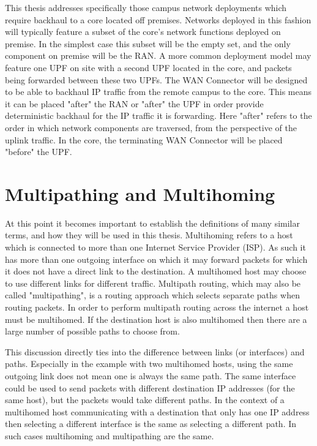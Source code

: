 This thesis addresses specifically those campus network deployments which require backhaul to a core located off premises. Networks deployed in this fashion will typically feature a subset of the core's network functions deployed on premise. In the simplest case this subset will be the empty set, and the only component on premise will be the RAN. A more common deployment model may feature one UPF on site with a second UPF located in the core, and packets being forwarded between these two UPFs. The WAN Connector will be designed to be able to backhaul IP traffic from the remote campus to the core. This means it can be placed "after" the RAN or "after" the UPF in order provide deterministic backhaul for the IP traffic it is forwarding. Here "after" refers to the order in which network components are traversed, from the perspective of the uplink traffic. In the core, the terminating WAN Connector will be placed "before" the UPF.


\section{Multipathing and Multihoming}

At this point it becomes important to establish the definitions of many similar terms, and how they will be used in this thesis. Multihoming refers to a host which is connected to more than one Internet Service Provider (ISP). As such it has more than one outgoing interface on which it may forward packets for which it does not have a direct link to the destination. A multihomed host may choose to use different links for different traffic. Multipath routing, which may also be called "multipathing", is a routing approach which selects separate paths when routing packets. In order to perform multipath routing across the internet a host must be multihomed. If the destination host is also multihomed then there are a large number of possible paths to choose from.

This discussion directly ties into the difference between links (or interfaces) and paths. Especially in the example with two multihomed hosts, using the same outgoing link does not mean one is always the same path. The same interface could be used to send packets with different destination IP addresses (for the same host), but the packets would take different paths. In the context of a multihomed host communicating with a destination that only has one IP address then selecting a different interface is the same as selecting a different path. In such cases multihoming and multipathing are the same.

